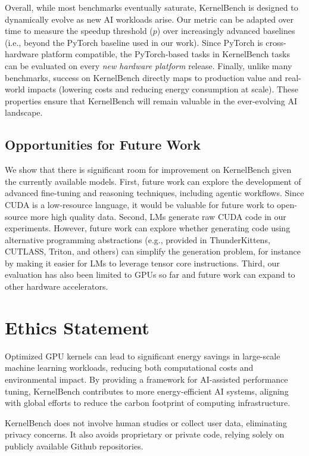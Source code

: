 Overall, while most benchmarks eventually saturate, KernelBench is designed to dynamically evolve as new AI workloads arise.  Our  metric can be adapted over time to measure the speedup threshold ($p$) over increasingly advanced baselines (i.e., beyond the PyTorch baseline used in our work). Since PyTorch is cross-hardware platform compatible, the PyTorch-based tasks in KernelBench tasks can be evaluated on every \textit{new hardware platform} release. 
Finally, unlike many benchmarks, success on KernelBench directly maps to production value and real-world impacts (lowering costs and reducing energy consumption at scale). These properties ensure that KernelBench will remain valuable in the ever-evolving AI landscape.

\subsection{Opportunities for Future Work}
We show that there is significant room for improvement on KernelBench given the currently available models. 
First, future work can explore the development of advanced fine-tuning and reasoning techniques, including agentic workflows. Since CUDA is a low-resource language, it would be valuable for future work to open-source more high quality data. Second, LMs generate raw CUDA code in our experiments. However, future work can explore whether generating code using alternative programming abstractions (e.g., provided in ThunderKittens, CUTLASS, Triton, and others) can simplify the generation problem, for instance by making it easier for LMs to leverage tensor core instructions. Third, our evaluation has also been limited to GPUs so far and future work can expand to other hardware accelerators. 

\section*{Ethics Statement}
Optimized GPU kernels can lead to significant energy savings in large-scale machine learning workloads, reducing both computational costs and environmental impact. By providing a framework for AI-assisted performance tuning, KernelBench contributes to more energy-efficient AI systems, aligning with global efforts to reduce the carbon footprint of computing infrastructure.

KernelBench does not involve human studies or collect user data, eliminating privacy concerns. It also avoids proprietary or private code, relying solely on publicly available Github repositories.